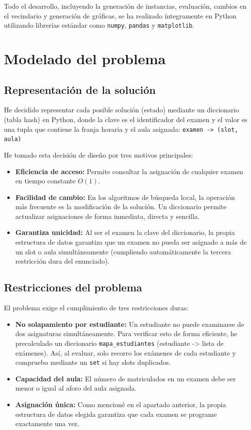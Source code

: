 \documentclass[12pt]{article}
\begin{document}
Todo el desarrollo, incluyendo la generación de instancias, evaluación, cambios en el vecindario y generación de gráficas, se ha realizado íntegramente en Python utilizando librerías estándar como \texttt{numpy}, \texttt{pandas} y \texttt{matplotlib}.

\section{Modelado del problema}
\subsection{Representación de la solución}
He decidido representar cada posible solución (estado) mediante un diccionario (tabla hash) en Python, donde la clave es el identificador del examen y el valor es una tupla que contiene la franja horaria y el aula asignada:
\texttt{examen -> (slot, aula)}

He tomado esta decisión de diseño por tres motivos principales:
\begin{itemize}
    \item \textbf{Eficiencia de acceso:} Permite consultar la asignación de cualquier examen en tiempo constante $O(1)$.
    \item \textbf{Facilidad de cambio:} En los algoritmos de búsqueda local, la operación más frecuente es la modificación de la solución. Un diccionario permite actualizar asignaciones de forma inmediata, directa y sencilla.
    \item \textbf{Garantiza unicidad:} Al ser el examen la clave del diccionario, la propia estructura de datos garantiza que un examen no pueda ser asignado a más de un slot o aula simultáneamente (cumpliendo automáticamente la tercera restricción dura del enunciado).
\end{itemize}

\subsection{Restricciones del problema}
El problema exige el cumplimiento de tres restricciones duras:
\begin{itemize}
    \item \textbf{No solapamiento por estudiante:} Un estudiante no puede examinarse de dos asignaturas simultáneamente. Para verificar esto de forma eficiente, he precalculado un diccionario \texttt{mapa\_estudiantes} (estudiante -> lista de exámenes). Así, al evaluar, solo recorro los exámenes de cada estudiante y compruebo mediante un \texttt{set} si hay slots duplicados.
    \item \textbf{Capacidad del aula:} El número de matriculados en un examen debe ser menor o igual al aforo del aula asignada.
    \item \textbf{Asignación única:} Como mencioné en el apartado anterior, la propia estructura de datos elegida garantiza que cada examen se programe exactamente una vez.
\end{itemize}
\end{document}
